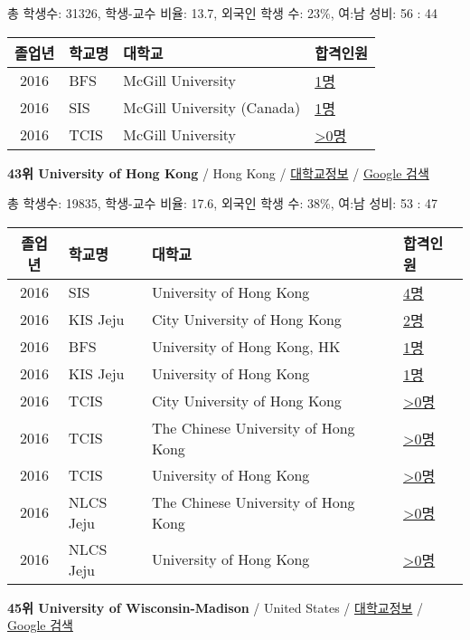 \documentclass[13pt,]{article}
\begin{document}
총 학생수: 31326, 학생-교수 비율: 13.7, 외국인 학생 수: 23\%, 여:남
성비: 56 : 44

\begin{longtable}[]{@{}clll@{}}
\toprule
졸업년 & 학교명 & 대학교 & 합격인원\tabularnewline
\midrule
\endhead
2016 & BFS & McGill University &
\href{http://cafe.naver.com/assarabia/11597}{1명}\tabularnewline
2016 & SIS & McGill University (Canada) &
\href{http://cafe.naver.com/assarabia/11589}{1명}\tabularnewline
2016 & TCIS & McGill University &
\href{http://cafe.naver.com/assarabia/11598}{\textgreater{}0명}\tabularnewline
\bottomrule
\end{longtable}

\textbf{43위 University of Hong Kong} / Hong Kong /
\href{https://www.timeshighereducation.com/world-university-rankings/university-of-hong-kong?ranking-dataset=589595}{대학교정보}
/ \href{http://www.google.com/search?q=University+of+Hong+Kong}{Google
검색}

총 학생수: 19835, 학생-교수 비율: 17.6, 외국인 학생 수: 38\%, 여:남
성비: 53 : 47

\begin{longtable}[]{@{}clll@{}}
\toprule
졸업년 & 학교명 & 대학교 & 합격인원\tabularnewline
\midrule
\endhead
2016 & SIS & University of Hong Kong &
\href{http://cafe.naver.com/assarabia/11589}{4명}\tabularnewline
2016 & KIS Jeju & City University of Hong Kong &
\href{http://cafe.naver.com/assarabia/11596}{2명}\tabularnewline
2016 & BFS & University of Hong Kong, HK &
\href{http://cafe.naver.com/assarabia/11597}{1명}\tabularnewline
2016 & KIS Jeju & University of Hong Kong &
\href{http://cafe.naver.com/assarabia/11596}{1명}\tabularnewline
2016 & TCIS & City University of Hong Kong &
\href{http://cafe.naver.com/assarabia/11598}{\textgreater{}0명}\tabularnewline
2016 & TCIS & The Chinese University of Hong Kong &
\href{http://cafe.naver.com/assarabia/11598}{\textgreater{}0명}\tabularnewline
2016 & TCIS & University of Hong Kong &
\href{http://cafe.naver.com/assarabia/11598}{\textgreater{}0명}\tabularnewline
2016 & NLCS Jeju & The Chinese University of Hong Kong &
\href{http://cafe.naver.com/assarabia/11592}{\textgreater{}0명}\tabularnewline
2016 & NLCS Jeju & University of Hong Kong &
\href{http://cafe.naver.com/assarabia/11592}{\textgreater{}0명}\tabularnewline
\bottomrule
\end{longtable}

\textbf{45위 University of Wisconsin-Madison} / United States /
\href{https://www.timeshighereducation.com/world-university-rankings/university-of-wisconsin-madison?ranking-dataset=589595}{대학교정보}
/
\href{http://www.google.com/search?q=University+of+Wisconsin-Madison}{Google
검색}
\end{document}
